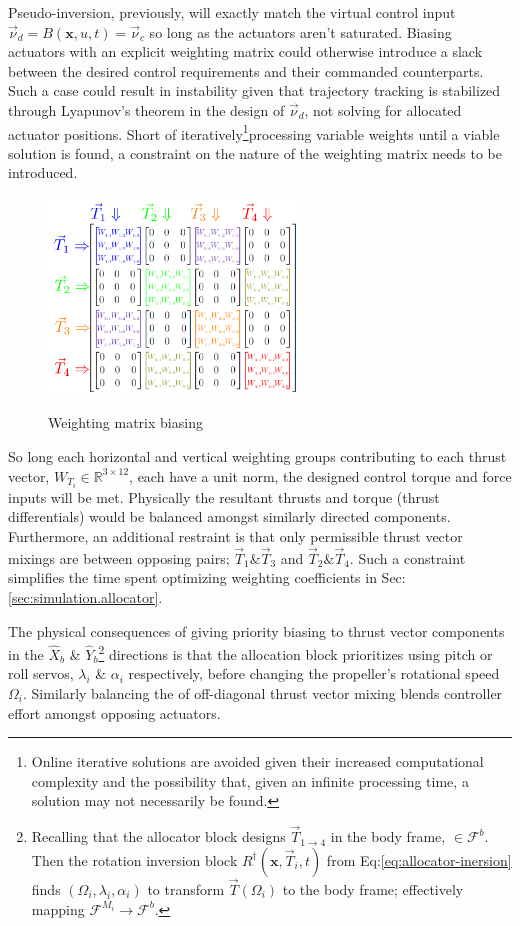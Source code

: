 Pseudo-inversion, previously, will exactly match the virtual control input $\vec{\nu}_d=B(\mathbf{x},u,t)=\vec{\nu}_c$ so long as the actuators aren't saturated. Biasing actuators with an explicit weighting matrix could otherwise introduce a slack between the desired control requirements and their commanded counterparts. Such a case could result in instability given that trajectory tracking is stabilized through Lyapunov's theorem in the design of $\vec{\nu}_d$, not solving for allocated actuator positions. Short of iteratively\footnote{Online iterative solutions are avoided given their increased computational complexity and the possibility that, given an infinite processing time, a solution may not necessarily be found.}processing variable weights until a viable solution is found, a constraint on the nature of the weighting matrix needs to be introduced.
\begin{figure}[htbp]
\centering
\includegraphics[width=0.6\textwidth]{figs/weighted-matrix}
\label{fig:weighted-matrix}
\caption{Weighting matrix biasing}
\end{figure}
\par
So long each horizontal and vertical weighting groups contributing to each thrust vector, $W_{T_i}\in\mathbb{R}^{3\times 12}$, each have a unit norm, the designed control torque and force inputs will be met. Physically the resultant thrusts and torque (thrust differentials) would be balanced amongst similarly directed components. Furthermore, an additional restraint is that only permissible thrust vector mixings are between opposing pairs; $\vec{T}_1\text{\&}\vec{T}_3$ and $\vec{T}_2\text{\&}\vec{T}_4$. Such a constraint simplifies the time spent optimizing weighting coefficients in Sec:\ref{sec:simulation.allocator}.
\par
The physical consequences of giving priority biasing to thrust vector components in the $\hat{X}_b$ \& $\hat{Y}_b$\footnote{Recalling that the allocator block designs $\vec{T}_{1\rightarrow 4}$ in the body frame, $\in\mathcal{F}^b$. Then the rotation inversion block $R^\dagger(\mathbf{x},\vec{T}_i,t)$ from Eq:\ref{eq:allocator-inersion} finds $(\Omega_i,\lambda_i,\alpha_i)$ to transform $\vec{T}(\Omega_i)$ to the body frame; effectively mapping $\mathcal{F}^{M_i}\rightarrow\mathcal{F}^b$.} directions is that the allocation block prioritizes using pitch or roll servos, $\lambda_i$ \& $\alpha_i$ respectively, before changing the propeller's rotational speed $\Omega_i$. Similarly balancing the of off-diagonal thrust vector mixing blends controller effort amongst opposing actuators. 
